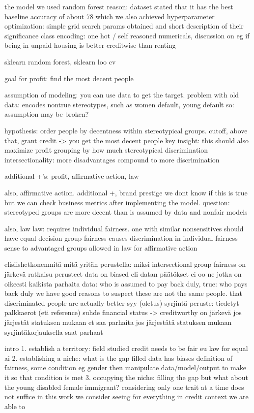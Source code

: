 \documentclass{article}
\begin{document}
the model we used
    random forest
        reason: dataset stated that it has the best baseline accuracy of about 78%
            which we also achieved
    hyperparameter optimization: simple grid search
        params obtained and short description of their significance
    class encoding: one hot / self reasoned numericals, discussion on 
        eg if being in unpaid housing is better creditwise than renting  
        
sklearn random forest, sklearn loo cv


goal for profit: find the most decent people

assumption of modeling: you can use data to get the target.
    problem with old data: encodes nontrue stereotypes, such as women default, young default 
    so: assumption may be broken?

hypothesis: order people by decentness within stereotypical groups.
cutoff, above that, grant credit -> you get the most decent people 
    key insight: this should also maximize profit
grouping by how much stereotypical discrimination
    intersectionality: more disadvantages compound to more discrimination    

additional +'s: profit, affirmative action, law

also, affirmative action. additional +, brand prestige
we dont know if this is true but we can check business metrics after implementing 
    the model.
question: stereotyped groups are more decent than is assumed by data and nonfair models

also, law
law: requires individual fairness. one with similar nonsensitives should 
    have equal decision 
group fairness causes discrimination in individual fairness sense to advantaged groups 
    allowed in law for affirmative action 

elisiishetkonenmitä
mitä yritän perustella: miksi intersectional group fairness on järkevä ratkaisu
perusteet
    data on biased eli datan päätökset ei oo ne jotka on oikeesti kaikista parhaita
        data: who is assumed to pay back duly, true: who pays back duly 
        we have good reasons to suspect these are not the same people. that discriminated people are actually better
        syy (oletus) syrjintä
        peruste: tiedetyt palkkaerot (eti reference)
    suhde financial status -> creditworthy on järkevä
    jos järjestät statuksen mukaan et saa parhaita
        jos järjestätä statuksen mukaan syrjintäkorjauksella saat parhaat

        intro 
        1. establish a territory: field studied
credit needs to be fair 
eu law for equal ai
2. establishing a niche: what is the gap filled
data has biases
definition of fairness, some condition eg gender 
then manipulate data/model/output to make it so that condition is met 
3. occupying the niche: filling the gap
but what about the young disabled female immigrant?
considering only one trait at a time does not suffice
in this work we consider seeing for everything in credit context
we are able to 

\printbibliography
\end{document}
